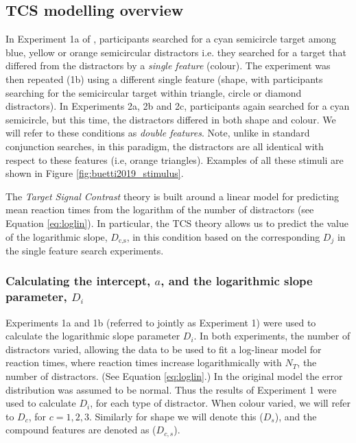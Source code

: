 \documentclass[smallextended, natbib]{svjour3}       %
\begin{document}
\subsection{TCS modelling overview} 

In Experiment 1a of \cite{buetti2019predicting}, participants searched for a cyan semicircle target among blue, yellow or orange semicircular distractors i.e. they searched for a target that differed from the distractors by a \textit{single feature} (colour). The experiment was then repeated (1b) using a different single feature (shape, with participants searching for the semicircular target within triangle, circle or diamond distractors). In Experiments 2a, 2b and 2c, participants again searched for a cyan semicircle, but this time, the distractors differed in both shape and colour. We will refer to these conditions as \textit{double features}. Note, unlike in standard conjunction searches, in this paradigm, the distractors are all identical with respect to these features (i.e, orange triangles). Examples of all these stimuli are shown in Figure \ref{fig:buetti2019_stimulus}.

The \textit{Target Signal Contrast} theory is built around a linear model for predicting mean reaction times from the logarithm of the number of distractors (see Equation \ref{eq:loglin}). In particular, the TCS theory allows us to predict the value of the logarithmic slope, $D_\text{c,s}$, in this condition based on the corresponding $D_j$ in the single feature search experiments. 

\subsubsection{Calculating the intercept, $a$, and the logarithmic slope parameter, $D_i$}
\label{sec:fitting_D}

Experiments 1a and 1b (referred to jointly as Experiment 1) were used to calculate the logarithmic slope parameter $D_i$. In both experiments, the number of distractors varied, allowing the data to be used to fit a log-linear model for reaction times, where reaction times increase logarithmically with $N_T$, the number of distractors. (See Equation \ref{eq:loglin}.) In the original model the error distribution was assumed to be normal. Thus the results of Experiment 1 were used to calculate $D_i$, for each type of distractor. When colour varied, we will refer to $D_c$, for $c=1,2,3$. Similarly for shape we will denote this ($D_s$), and the compound features are denoted as ($D_{c,s}$). 
\end{document}
